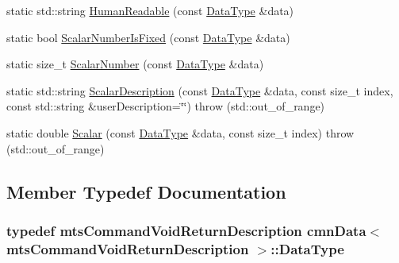\begin{DoxyCompactItemize}
\item 
static std\+::string \hyperlink{classcmn_data_3_01mts_command_void_return_description_01_4_a4702aea0e703003e2c82f225a98ae819}{Human\+Readable} (const \hyperlink{classcmn_data_3_01mts_command_void_return_description_01_4_aff459b36dbdb34ec4dc27dbfea116040}{Data\+Type} \&data)
\item 
static bool \hyperlink{classcmn_data_3_01mts_command_void_return_description_01_4_ae71560bec430da0705024e03a5b5a540}{Scalar\+Number\+Is\+Fixed} (const \hyperlink{classcmn_data_3_01mts_command_void_return_description_01_4_aff459b36dbdb34ec4dc27dbfea116040}{Data\+Type} \&data)
\item 
static size\+\_\+t \hyperlink{classcmn_data_3_01mts_command_void_return_description_01_4_ab07f8cc8cca1946df9f77be7338dca8e}{Scalar\+Number} (const \hyperlink{classcmn_data_3_01mts_command_void_return_description_01_4_aff459b36dbdb34ec4dc27dbfea116040}{Data\+Type} \&data)
\item 
static std\+::string \hyperlink{classcmn_data_3_01mts_command_void_return_description_01_4_a08887a0dbebd28d98ab84ea6f640957d}{Scalar\+Description} (const \hyperlink{classcmn_data_3_01mts_command_void_return_description_01_4_aff459b36dbdb34ec4dc27dbfea116040}{Data\+Type} \&data, const size\+\_\+t index, const std\+::string \&user\+Description=\char`\"{}\char`\"{})  throw (std\+::out\+\_\+of\+\_\+range)
\item 
static double \hyperlink{classcmn_data_3_01mts_command_void_return_description_01_4_a250f112327ecb676bdc87b0784313616}{Scalar} (const \hyperlink{classcmn_data_3_01mts_command_void_return_description_01_4_aff459b36dbdb34ec4dc27dbfea116040}{Data\+Type} \&data, const size\+\_\+t index)  throw (std\+::out\+\_\+of\+\_\+range)
\end{DoxyCompactItemize}


\subsection{Member Typedef Documentation}
\hypertarget{classcmn_data_3_01mts_command_void_return_description_01_4_aff459b36dbdb34ec4dc27dbfea116040}{}
\subsubsection[{Data\+Type}]{\setlength{\rightskip}{0pt plus 5cm}typedef {\bf mts\+Command\+Void\+Return\+Description} {\bf cmn\+Data}$<$ {\bf mts\+Command\+Void\+Return\+Description} $>$\+::{\bf Data\+Type}}\label{classcmn_data_3_01mts_command_void_return_description_01_4_aff459b36dbdb34ec4dc27dbfea116040}


